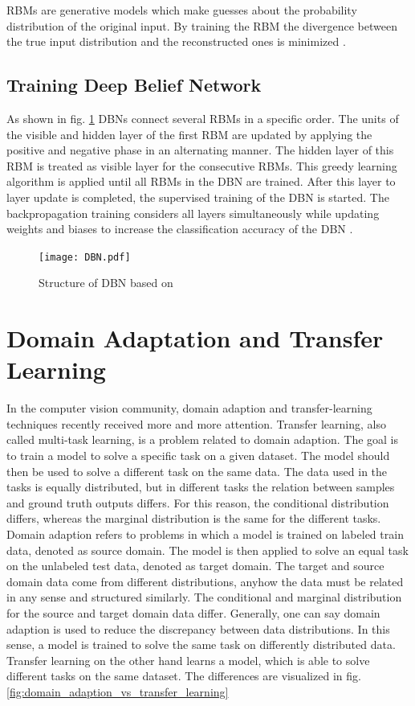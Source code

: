 RBMs are generative models which make guesses about the probability distribution of the original input. By training the RBM the divergence between the true input distribution and the reconstructed ones is minimized \cite{Hinton2010}.

\subsection{Training Deep Belief Network}
As shown in fig. \ref{fig:DBN} DBNs connect several RBMs in a specific order. The units of the visible and hidden layer of the first RBM are updated by applying the positive and negative phase in an alternating manner. The hidden layer of this RBM is treated as visible layer for the consecutive RBMs. This greedy learning algorithm is applied until all RBMs in the DBN are trained. After this layer to layer update is completed, the supervised training of the DBN is started. The backpropagation training considers all layers simultaneously while updating weights and biases to increase the classification accuracy of the DBN \cite{Zhang2017}.

\begin{figure}[H]
  \centering
  \texttt{[image: DBN.pdf]}
  \caption {Structure of DBN based on \cite{Zhang2017}} \label{fig:DBN}
\end{figure}


\section{Domain Adaptation and Transfer Learning}

In the computer vision community, domain adaption and transfer-learning techniques recently received more and more attention. Transfer learning, also called multi-task learning, is a problem related to domain adaption. The goal is to train a model to solve a specific task on a given dataset. The model should then be used to solve a different task on the same data. The data used in the tasks is equally distributed, but in different tasks the relation between samples and ground truth outputs differs. For this reason, the conditional distribution differs, whereas the marginal distribution is the same for the different tasks. Domain adaption refers to problems in which a model is trained on labeled train data, denoted as source domain. The model is then applied to solve an equal task on the unlabeled test data, denoted as target domain. The target and source domain data come from different distributions, anyhow the data must be related in any sense and structured similarly. The conditional and marginal distribution for the source and target domain data differ. Generally, one can say domain adaption is used to reduce the discrepancy between data distributions. In this sense, a model is trained to solve the same task on differently distributed data. Transfer learning on the other hand learns a model, which is able to solve different tasks on the same dataset. The differences are visualized in fig. \ref{fig:domain_adaption_vs_transfer_learning}

